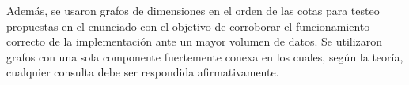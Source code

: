 Además, se usaron grafos de dimensiones en el orden de las cotas para testeo propuestas en el enunciado con el objetivo de corroborar el funcionamiento correcto de la implementación ante un mayor volumen de datos. Se utilizaron grafos con una sola componente fuertemente conexa en los cuales, según la teoría, cualquier consulta debe ser respondida afirmativamente.
